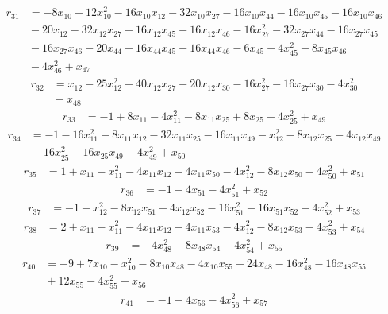 \[\begin{aligned}
r_{31}&=-8x_{10}-12x_{10}^{2}-16x_{10}x_{12}-32x_{10}x_{27}-16x_{10}x_{44}-16x_{10}x_{45}-16x_{10}x_{46}\\
&{}-20x_{12}-32x_{12}x_{27}-16x_{12}x_{45}-16x_{12}x_{46}-16x_{27}^{2}-32x_{27}x_{44}-16x_{27}x_{45}\\
&{}-16x_{27}x_{46}-20x_{44}-16x_{44}x_{45}-16x_{44}x_{46}-6x_{45}-4x_{45}^{2}-8x_{45}x_{46}\\
&{}-4x_{46}^{2}+x_{47}
\end{aligned}\]
\[\begin{aligned}
r_{32}&=x_{12}-25x_{12}^{2}-40x_{12}x_{27}-20x_{12}x_{30}-16x_{27}^{2}-16x_{27}x_{30}-4x_{30}^{2}\\
&{}+x_{48}
\end{aligned}\]
\[\begin{aligned}
r_{33}&=-1+8x_{11}-4x_{11}^{2}-8x_{11}x_{25}+8x_{25}-4x_{25}^{2}+x_{49}
\end{aligned}\]
\[\begin{aligned}
r_{34}&=-1-16x_{11}^{2}-8x_{11}x_{12}-32x_{11}x_{25}-16x_{11}x_{49}-x_{12}^{2}-8x_{12}x_{25}-4x_{12}x_{49}\\
&{}-16x_{25}^{2}-16x_{25}x_{49}-4x_{49}^{2}+x_{50}
\end{aligned}\]
\[\begin{aligned}
r_{35}&=1+x_{11}-x_{11}^{2}-4x_{11}x_{12}-4x_{11}x_{50}-4x_{12}^{2}-8x_{12}x_{50}-4x_{50}^{2}+x_{51}
\end{aligned}\]
\[\begin{aligned}
r_{36}&=-1-4x_{51}-4x_{51}^{2}+x_{52}
\end{aligned}\]
\[\begin{aligned}
r_{37}&=-1-x_{12}^{2}-8x_{12}x_{51}-4x_{12}x_{52}-16x_{51}^{2}-16x_{51}x_{52}-4x_{52}^{2}+x_{53}
\end{aligned}\]
\[\begin{aligned}
r_{38}&=2+x_{11}-x_{11}^{2}-4x_{11}x_{12}-4x_{11}x_{53}-4x_{12}^{2}-8x_{12}x_{53}-4x_{53}^{2}+x_{54}
\end{aligned}\]
\[\begin{aligned}
r_{39}&=-4x_{48}^{2}-8x_{48}x_{54}-4x_{54}^{2}+x_{55}
\end{aligned}\]
\[\begin{aligned}
r_{40}&=-9+7x_{10}-x_{10}^{2}-8x_{10}x_{48}-4x_{10}x_{55}+24x_{48}-16x_{48}^{2}-16x_{48}x_{55}\\
&{}+12x_{55}-4x_{55}^{2}+x_{56}
\end{aligned}\]
\[\begin{aligned}
r_{41}&=-1-4x_{56}-4x_{56}^{2}+x_{57}
\end{aligned}\]
